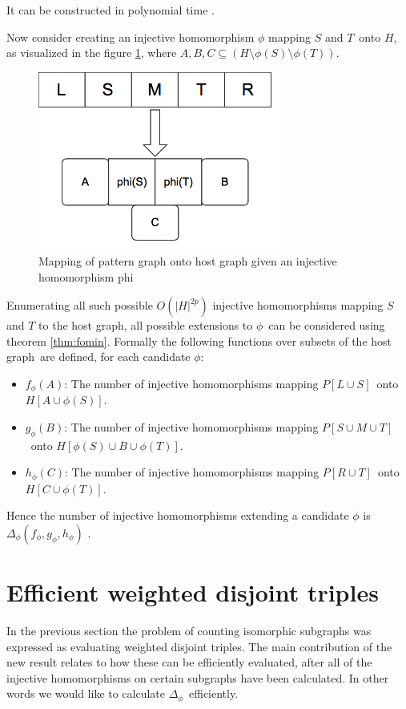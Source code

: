 \documentclass[a4paper,11pt]{report}
\theoremstyle{plain}
\theoremstyle{definition}
\begin{document}
It can be constructed in polynomial time \cite{BHKK13}.

Now consider creating an injective homomorphism $\phi$ mapping $S$ and $T$ onto $H$, as visualized in the figure \ref{fig:homo-viz},
where $A,B,C \subseteq (H \setminus \phi(S) \setminus \phi(T))$.

\begin{figure}[here]
\centering
\includegraphics[width=8cm]{images/sketch_homo.png} 
\caption[Mapping]{Mapping of pattern graph onto host graph given an injective homomorphism phi}
\label{fig:homo-viz}
\end{figure}

Enumerating all such possible $O(|H|^{2p})$ injective homomorphisms mapping $S$ and $T$ to the host graph,
all possible extensions to $\phi$ can be considered using theorem \ref{thm:fomin}.
Formally the following functions over subsets of the host graph are defined, for each candidate $\phi$:

\begin{itemize}
\item $f_\phi(A)$: The number of injective homomorphisms mapping $P[L \cup S]$ onto $H[A \cup \phi(S)]$.
\item $g_\phi(B)$: The number of injective homomorphisms mapping $P[S \cup M \cup T]$ onto $H[\phi(S) \cup B \cup \phi(T)]$.
\item $h_\phi(C)$: The number of injective homomorphisms mapping $P[R \cup T]$ onto $H[C \cup \phi(T)]$.
\end{itemize}

Hence the number of injective homomorphisms extending a candidate $\phi$ is $\Delta_\phi(f_\phi, g_\phi, h_\phi)$ \cite{BHKK13}.

\section{Efficient weighted disjoint triples}
In the previous section the problem of counting isomorphic subgraphs was expressed as evaluating weighted disjoint triples.
The main contribution of the new result \cite{BHKK13} relates to how these can be efficiently evaluated, after all of the
injective homomorphisms on certain subgraphs have been calculated.
In other words we would like to calculate $\Delta_\phi$ efficiently.
\end{document}
